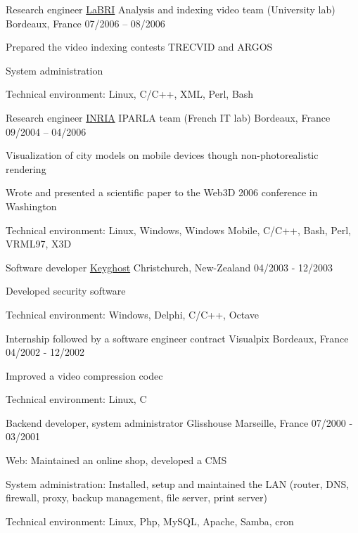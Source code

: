 \begin{cventries}
  \cventry
    {Research engineer}
    {\href{https://www.labri.fr/}{LaBRI} Analysis and indexing video team
    (University lab)} {Bordeaux, France}
    {07/2006 – 08/2006}
    {
      \begin{cvitems}
        \item {Prepared the video indexing contests TRECVID and ARGOS}
        \item {System administration}
        \item {Technical environment: Linux, C/C++, XML, Perl, Bash}
      \end{cvitems}
    }

  \cventry
    {Research engineer}
    {\href{https://www.inria.fr/}{INRIA} IPARLA team (French IT lab)}
    {Bordeaux, France}
    {09/2004 – 04/2006}
    {
      \begin{cvitems}
        \item {Visualization of city models on mobile devices though
            non-photorealistic rendering}
        \item {Wrote and presented a scientific paper to the Web3D 2006
            conference in Washington}
        \item {Technical environment: Linux, Windows, Windows Mobile, C/C++,
            Bash, Perl, VRML97, X3D}
      \end{cvitems}
    }

  \cventry
    {Software developer}
    {\href{https://www.keyghost.com/}{Keyghost}}
    {Christchurch, New-Zealand}
    {04/2003 - 12/2003}
    {
      \begin{cvitems}
        \item {Developed security software}
		\item {Technical environment: Windows, Delphi, C/C++, Octave}
      \end{cvitems}
    }

  \cventry
    {Internship followed by a software engineer contract}
    {Visualpix}
    {Bordeaux, France}
    {04/2002 - 12/2002}
    {
      \begin{cvitems}
        \item {Improved a video compression codec}
		\item {Technical environment: Linux, C}
      \end{cvitems}
    }

  \cventry
    {Backend developer, system administrator}
    {Glisshouse}
    {Marseille, France}
    {07/2000 - 03/2001}
    {
      \begin{cvitems}
        \item {Web: Maintained an online shop, developed a CMS}
        \item {System administration: Installed, setup and maintained the LAN
            (router, DNS, firewall, proxy, backup management, file server,
            print server)}
		\item {Technical environment: Linux, Php, MySQL, Apache, Samba, cron}
      \end{cvitems}
    }

\end{cventries}
